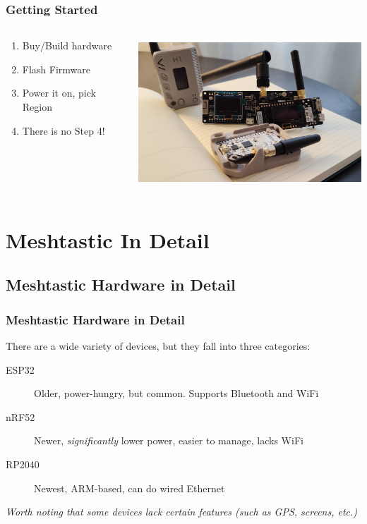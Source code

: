 \documentclass[aspectratio=169]{beamer}
\begin{document}
\begin{frame}[fragile]
  \frametitle{Getting Started}
  \begin{columns}[]
    \begin{column}[T]{0.35\paperwidth}
      \begin{enumerate}[<+->]
        \item{Buy/Build hardware}
        \item{Flash Firmware}
        \item{Power it on, pick Region}
        \item{There is no Step 4!}
      \end{enumerate}
    \end{column}
    \begin{column}[T]{0.55\paperwidth}
      \includegraphics[height=5.5cm,keepaspectratio]{images/boards.jpg}
    \end{column}
  \end{columns}
\end{frame}

\section{Meshtastic In Detail}
\subsection{Meshtastic Hardware in Detail}
\begin{frame}[fragile]
  \frametitle{Meshtastic Hardware in Detail}
  There are a wide variety of devices, but they fall into three categories:
  \begin{description}%
    \item[ESP32]{Older, power-hungry, but common. Supports Bluetooth and WiFi}
    \item[nRF52]{Newer, \emph{significantly} lower power, easier to manage, lacks WiFi}
    \item[RP2040]{Newest, ARM-based, can do wired Ethernet}
  \end{description}
  \vfill{}
  \emph{Worth noting that some devices lack certain features (such as GPS, screens, etc.)}
\end{frame}
\end{document}
